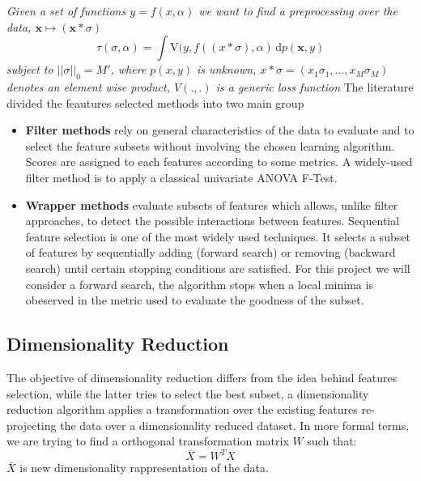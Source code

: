 \documentclass[a4paper,10pt]{article}
\begin{document}
  \textit{Given a set of functions $y = f(x,\alpha)$ we want to find a preprocessing over the data, $\textbf{x} \mapsto (\textbf{x} * \sigma)$}
  \begin{equation}
    \tau(\sigma, \alpha) = \int \mathrm V(y,f((x*\sigma),\alpha) \,\mathrm{d}p(\textbf{x},y)
  \end{equation}
  \textit{subject to $||\sigma||_0 = M'$,  where $p(x,y)$ is unknown, $x * \sigma = (x_1 \sigma_1, ... , x_M \sigma_M)$ denotes an
  element wise product, $V (.,.)$ is a generic loss function} \newline
  The literature divided the feautures selected methods into two main group
  \begin{itemize}
   \item \textbf{Filter methods} rely on general characteristics of the data to evaluate and to select the feature subsets without
	 involving the chosen learning algorithm. Scores are assigned to each features according to some metrics.\newline
	 A widely-used filter method is to apply a classical univariate ANOVA F-Test. 

   \item \textbf{Wrapper methods} evaluate subsets of features which allows, unlike filter approaches, to detect the possible
	 interactions between features.\newline
	 Sequential feature selection is one of the most widely used techniques. It selects a subset of features by sequentially adding 
	 (forward search) or removing (backward search) until certain stopping conditions are satisfied.
	 For this project we will consider a forward search, the algorithm stops when a local minima is obeserved in the metric used
	 to evaluate the goodness of the subset.
  \end{itemize}
  
  \subsection{Dimensionality Reduction}
    The objective of dimensionality reduction differs from the idea behind features selection, while the latter tries to select
    the best subset, a dimensionality reduction algorithm applies a transformation over the existing features re-projecting the 
    data over a dimensionality reduced dataset.\newline
    In more formal terms, we are trying to find a orthogonal transformation matrix $W$ such that:
    \begin{equation}
     \overline{X} = W^T X
    \end{equation}
    $\overline{X}$ is new dimensionality rappresentation of the data.
  
\end{document}
